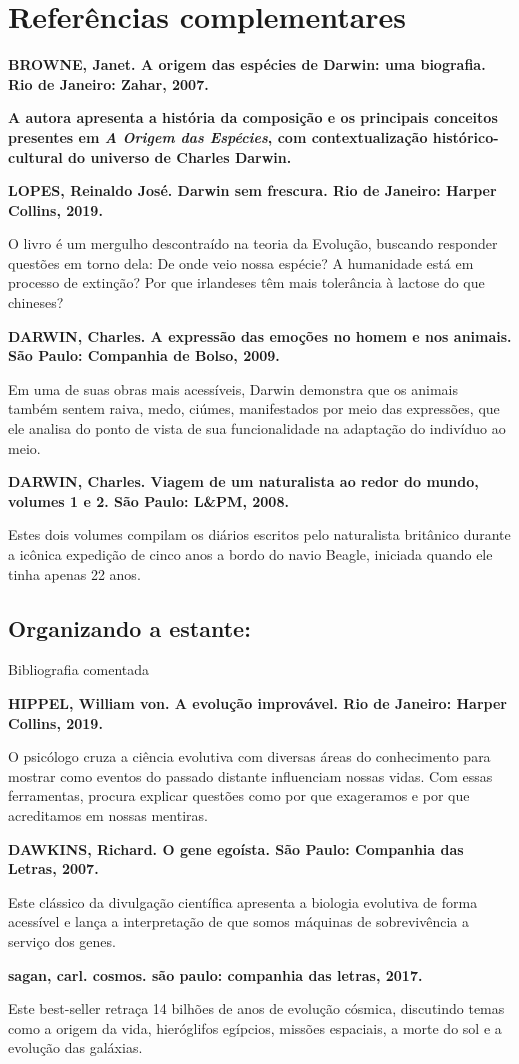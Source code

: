 \documentclass[12pt]{extarticle}
\begin{document}
\section{Referências complementares}

\textbf{BROWNE, Janet. A origem das espécies de Darwin: uma biografia.  Rio de
Janeiro: Zahar, 2007.}

\textbf{A autora apresenta a história da composição e os principais conceitos
presentes em \emph{A Origem das Espécies}, com contextualização
histórico-cultural do universo de Charles Darwin.}

\textbf{LOPES, Reinaldo José. Darwin sem frescura. Rio de Janeiro: Harper
Collins, 2019.}

O livro é um mergulho descontraído na teoria da Evolução, buscando responder
questões em torno dela: De onde veio nossa espécie? A humanidade está em
processo de extinção? Por que irlandeses têm mais tolerância à lactose do que
chineses?

\textbf{DARWIN, Charles. A expressão das emoções no homem e nos animais.  São
Paulo: Companhia de Bolso, 2009.}

Em uma de suas obras mais acessíveis, Darwin demonstra que os animais também
sentem raiva, medo, ciúmes, manifestados por meio das expressões, que ele
analisa do ponto de vista de sua funcionalidade na adaptação do indivíduo ao
meio.

\textbf{DARWIN, Charles. Viagem de um naturalista ao redor do mundo, volumes
1 e 2. São Paulo: L\&PM, 2008.}

Estes dois volumes compilam os diários escritos pelo naturalista britânico
durante a icônica expedição de cinco anos a bordo do navio Beagle, iniciada
quando ele tinha apenas 22 anos.

\subsection{Organizando a estante:} Bibliografia comentada

\textbf{HIPPEL, William von. A evolução improvável. Rio de Janeiro: Harper
Collins, 2019.}

O psicólogo cruza a ciência evolutiva com diversas áreas do conhecimento para
mostrar como eventos do passado distante influenciam nossas vidas.  Com essas
ferramentas, procura explicar questões como por que exageramos e por que
acreditamos em nossas mentiras.

\textbf{DAWKINS, Richard. O gene egoísta. São Paulo: Companhia das Letras,
2007.}

Este clássico da divulgação científica apresenta a biologia evolutiva de forma
acessível e lança a interpretação de que somos máquinas de sobrevivência
a serviço dos genes.

\textbf{sagan, carl. cosmos. são paulo: companhia das letras, 2017.}

Este best-seller retraça 14 bilhões de anos de evolução cósmica, discutindo
temas como a origem da vida, hieróglifos egípcios, missões espaciais, a morte
do sol e a evolução das galáxias.
\end{document}
